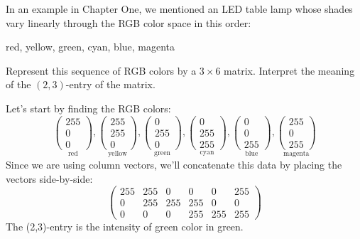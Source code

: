 \documentclass{ximera}
\begin{document}
\begin{example}
  In an example in Chapter One, we mentioned an LED table lamp whose shades
  vary linearly through the RGB color space in this order:
  \begin{center}
    red, yellow, green, cyan, blue, magenta
  \end{center}
  Represent this sequence of RGB colors by a $3 \times 6$
  matrix. Interpret the meaning of the $(2,3)$-entry of the matrix.
  \begin{explanation}
    Let's start by finding the RGB colors:
    \[
    \underset{\text{red}}{\begin{pmatrix}255\\0\\0\end{pmatrix}},
    \underset{\text{yellow}}{\begin{pmatrix}255\\255\\0\end{pmatrix}},
    \underset{\text{green}}{\begin{pmatrix}0\\255\\0\end{pmatrix}},
    \underset{\text{cyan}}{\begin{pmatrix}0\\255\\255\end{pmatrix}},
    \underset{\text{blue}}{\begin{pmatrix}0\\0\\255\end{pmatrix}},
    \underset{\text{magenta}}{\begin{pmatrix}255\\0\\255\end{pmatrix}}
    \]
    Since we are using column vectors, we'll concatenate this data by
    placing the vectors side-by-side:
    \[\left(\begin{array}{cccccc}
    255 & 255 & 0 & 0 & 0 & 255\\
    0 & 255& 255 & 255 & 0 & 0 \\
    0 & 0 & 0 & 255 & 255 & 255
    \end{array}\right)\]
    The (2,3)-entry is the intensity of green color in green.
  \end{explanation}
\end{example}
\end{document}
